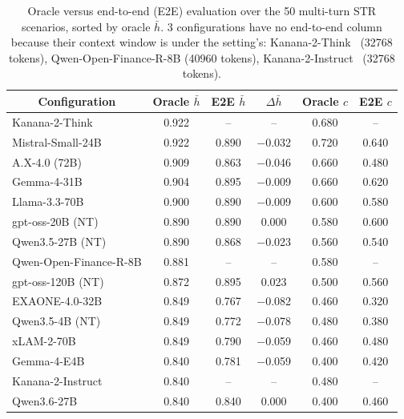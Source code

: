\begin{table}[t]
\centering
\footnotesize

\caption{Oracle versus end-to-end (E2E) evaluation over the 50 multi-turn STR scenarios, sorted by oracle $\bar{h}$. 3 configurations have no end-to-end column because their context window is under the setting's: Kanana-2-Think~\cite{kakao2025kanana} (32768 tokens), Qwen-Open-Finance-R-8B (40960 tokens), Kanana-2-Instruct~\cite{kakao2025kanana} (32768 tokens).}
\label{tab:e2e_full}

\begin{tabular}{lccccc}
\toprule
\multicolumn{1}{c}{\textbf{Configuration}} & \textbf{Oracle $\bar{h}$} & \textbf{E2E $\bar{h}$} & \textbf{$\Delta\bar{h}$} & \textbf{Oracle $c$} & \textbf{E2E $c$} \\
\midrule
Kanana-2-Think~\cite{kakao2025kanana} & 0.922 & -- & -- & 0.680 & -- \\
Mistral-Small-24B~\cite{mistral2025small} & 0.922 & 0.890 & $-$0.032 & 0.720 & 0.640 \\
A.X-4.0 (72B) & 0.909 & 0.863 & $-$0.046 & 0.660 & 0.480 \\
Gemma-4-31B & 0.904 & 0.895 & $-$0.009 & 0.660 & 0.620 \\
Llama-3.3-70B~\cite{grattafiori2024llama3} & 0.900 & 0.890 & $-$0.009 & 0.600 & 0.580 \\
gpt-oss-20B (NT)~\cite{openai2025gptoss} & 0.890 & 0.890 & 0.000 & 0.580 & 0.600 \\
Qwen3.5-27B (NT)~\cite{qwen3.5} & 0.890 & 0.868 & $-$0.023 & 0.560 & 0.540 \\
Qwen-Open-Finance-R-8B & 0.881 & -- & -- & 0.580 & -- \\
gpt-oss-120B (NT)~\cite{openai2025gptoss} & 0.872 & 0.895 & 0.023 & 0.500 & 0.560 \\
EXAONE-4.0-32B~\cite{bae2025exaone} & 0.849 & 0.767 & $-$0.082 & 0.460 & 0.320 \\
Qwen3.5-4B (NT)~\cite{qwen3.5} & 0.849 & 0.772 & $-$0.078 & 0.480 & 0.380 \\
xLAM-2-70B~\cite{prabhakar2025apigenmt} & 0.849 & 0.790 & $-$0.059 & 0.460 & 0.480 \\
Gemma-4-E4B & 0.840 & 0.781 & $-$0.059 & 0.400 & 0.420 \\
Kanana-2-Instruct~\cite{kakao2025kanana} & 0.840 & -- & -- & 0.480 & -- \\
Qwen3.6-27B~\cite{qwen3.6-27b} & 0.840 & 0.840 & 0.000 & 0.400 & 0.460 \\

\end{tabular}
\end{table}

